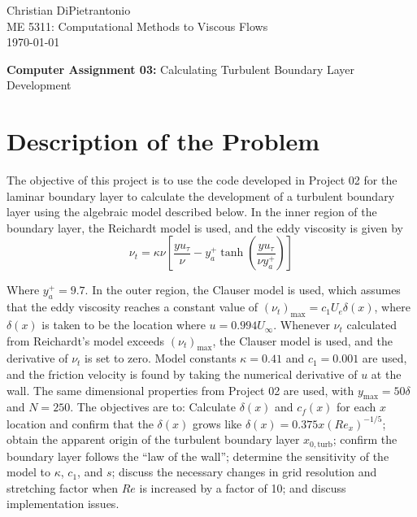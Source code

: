 \documentclass[letterpaper,12pt]{article}
\begin{document}


Christian DiPietrantonio \\
ME 5311: Computational Methods to Viscous Flows \\
\today

\vspace{6pt}


{\large \textbf{Computer Assignment 03:} \normalsize Calculating Turbulent Boundary Layer Development}


\section{Description of the Problem}
The objective of this project is to use the code developed in Project 02 for the laminar boundary layer to calculate the development of a turbulent boundary layer using the algebraic model described below. In the inner region of the boundary layer, the Reichardt model is used, and the eddy viscosity is given by
\begin{equation}
    \nu_t = \kappa \nu \left[ \frac{y u_{\tau}}{\nu} - y^{+}_{a} \tanh\left( \frac{y u_{\tau}}{\nu y^{+}_{a}} \right) \right]
\end{equation}

Where $y^{+}_{a} = 9.7$. In the outer region, the Clauser model is used, which assumes that the eddy viscosity reaches a constant value of $(\nu_t)_{\text{max}} = c_1 U_e \delta(x)$, where $\delta(x)$ is taken to be the location where $u = 0.994 U_{\infty}$. Whenever $\nu_t$ calculated from Reichardt's model exceeds $(\nu_t)_{\text{max}}$, the Clauser model is used, and the derivative of $\nu_t$ is set to zero. Model constants $\kappa = 0.41$ and $c_1 = 0.001$ are used, and the friction velocity is found by taking the numerical derivative of $u$ at the wall. The same dimensional properties from Project 02 are used, with $y_{\text{max}} = 50 \delta$ and $N = 250$. The objectives are to: Calculate $\delta(x)$ and $c_f (x)$ for each $x$ location and confirm that the $\delta(x)$ grows like $\delta(x) = 0.375 x (Re_x)^{-1/5}$; obtain the apparent origin of the turbulent boundary layer $x_{0,\text{turb}}$; confirm the boundary layer follows the ``law of the wall''; determine the sensitivity of the model to $\kappa$, $c_1$, and $s$; discuss the necessary changes in grid resolution and stretching factor when $Re$ is increased by a factor of 10; and discuss implementation issues.
\end{document}
